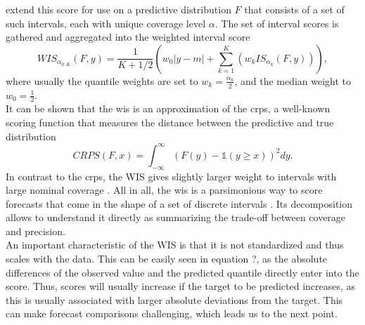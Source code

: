 \cite{bracher_evaluating_2021} extend this score for use on a predictive distribution $F$ that consists of a set of such intervals, each with unique coverage level $\alpha$. The set of interval scores is gathered and aggregated into the weighted interval score 
\begin{equation}
WIS_{\alpha_{0:K}}(F,y) = \frac{1}{K + 1/2}\left(w_{0}|y-m| + \sum_{k=1}^{K}\left(w_k IS_{\alpha_{k}}(F, y)\right)\right),
\end{equation}
where usually the quantile weights are set to $w_k = \frac{\alpha_{k}}{2}$, and the median weight to $w_{0} = \frac{1}{2}$.\\
It can be shown that the \ac{wis} is an approximation of the \ac{crps}, a well-known scoring function that measures the distance between the predictive and true distribution 
\begin{equation}
CRPS(F, x) = \int_{-\infty}^{\infty} \left(F(y) - \mathbb{1}(y \geq x) \right)^2dy.
\end{equation}
In contrast to the \ac{crps}, the WIS gives slightly larger weight to intervals with large nominal coverage \citep{bracher_evaluating_2021}.
All in all, the \ac{wis} is a parsimonious way to score forecasts that come in the shape of a set of discrete intervals \citep{sherratt_predictive_2022}. Its decomposition allows to understand it directly as summarizing the trade-off between coverage and precision. \\
An important characteristic of the WIS is that it is not standardized and thus scales with the data. This can be easily seen in equation ?, as the absolute differences of the observed value and the predicted quantile directly enter into the score. Thus, scores will usually increase if the target to be predicted increases, as this is usually associated with larger absolute deviations from the target. This can make forecast comparisons challenging, which leads us to the next point.
